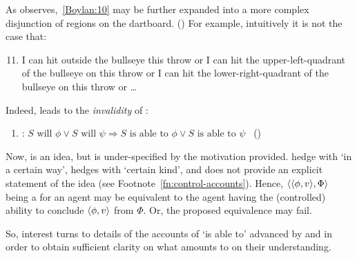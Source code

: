 \begin{note}[\BoyVS{}]
    As \citeauthor{Boylan:2020aa} observes,~\ref{Boylan:10} may be further expanded into a more complex disjunction of regions on the dartboard.
  (\citeyear[4]{Boylan:2020aa})
  For example, intuitively it is not the case that:
  \begin{enumerate}[label=(\arabic*'), resume]
    \setcounter{enumi}{10}
  \item
    I can hit outside the bullseye this throw or I can hit the upper-left-quadrant of the bullseye on this throw or I can hit the lower-right-quadrant of the bullseye on this throw or \dots
  \end{enumerate}

  Indeed, \AbControl{} leads to the \emph{invalidity} of \BoyVS{}:

  \begin{enumerate}[label=]
  \item
    \label{Boylan:Or-Success}
    \BoyVS{}: \(S\text{ will }\phi \lor S\text{ will }\psi \Rightarrow S\text{ is able to }\phi \lor S\text{ is able to }\psi\)\newline
    \mbox{ }\hfill\mbox{(\citeyear[\S1.2]{Boylan:2020aa})}
  \end{enumerate}
\end{note}

\begin{note}
  Now, \AbControl{} is an idea, but is under-specified by the motivation provided.
  \citeauthor{Mandelkern:2017aa} hedge with `in a certain way', \citeauthor{Schwarz:2020aa} hedges with `certain kind', and \citeauthor{Boylan:2020aa} does not provide an explicit statement of the idea (see Footnote~\ref{fn:control-accounts}).
  Hence, \(\langle \langle \phi, v \rangle, \Phi \rangle\) being a  for an agent may be equivalent to the agent having the (controlled) ability to conclude \(\langle \phi, v \rangle\) from \(\Phi\).
  Or, the proposed equivalence may fail.

  So, interest turns to details of the accounts of `is able to' advanced by \textcite{Mandelkern:2017aa} and \textcite{Boylan:2020aa} in order to obtain sufficient clarity on what \AbControl{} amounts to on their understanding.
\end{note}

